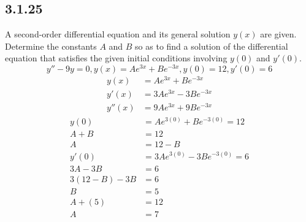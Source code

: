 \documentclass{article}
\begin{document}
\subsection{3.1.25}
A second-order differential equation and its general solution $ y(x) $ are given. Determine the constants $ A $ and $ B $ so as to find a solution of the differential equation that satisfies the given initial conditions involving $ y(0) $ and $ y'(0) $.
$$ y'' - 9y = 0, y(x) = Ae^{3x} + Be^{-3x}, y(0) = 12, y'(0) = 6 $$
\begin{align*}
	y(x) & = Ae^{3x} + Be^{-3x} \\
	y'(x) & = 3Ae^{3x} - 3Be^{-3x} \\
	y''(x) & = 9Ae^{3x} + 9Be^{-3x}
\end{align*}
\begin{align*}
	y(0) & = Ae^{3(0)} + Be^{-3(0)} = 12 \\
	A + B & = 12 \\
	A & = 12 - B \\
	y'(0) & = 3Ae^{3(0)} - 3Be^{-3(0)} = 6 \\
	3A - 3B & = 6 \\
	3(12 - B) - 3B & = 6 \\
	B & = 5 \\
	A + (5) & = 12 \\
	A & = 7
\end{align*}
\end{document}
